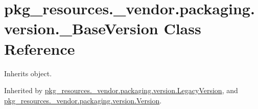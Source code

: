 \hypertarget{classpkg__resources_1_1__vendor_1_1packaging_1_1version_1_1___base_version}{}\section{pkg\+\_\+resources.\+\_\+vendor.\+packaging.\+version.\+\_\+\+Base\+Version Class Reference}
\label{classpkg__resources_1_1__vendor_1_1packaging_1_1version_1_1___base_version}


Inherits object.



Inherited by \hyperlink{classpkg__resources_1_1__vendor_1_1packaging_1_1version_1_1_legacy_version}{pkg\+\_\+resources.\+\_\+vendor.\+packaging.\+version.\+Legacy\+Version}, and \hyperlink{classpkg__resources_1_1__vendor_1_1packaging_1_1version_1_1_version}{pkg\+\_\+resources.\+\_\+vendor.\+packaging.\+version.\+Version}.

